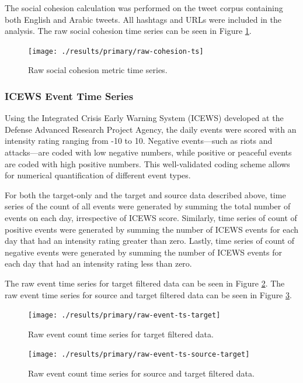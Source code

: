 \documentclass[
  english,
  man]{apa6}
\begin{document}
\noindent The social cohesion calculation was performed on the tweet corpus
containing both English and Arabic tweets. All hashtags and URLs were included
in the analysis. The raw social cohesion time series can be seen in Figure
\ref{fig:raw-cohesion-ts}.

\begin{figure}
\texttt{[image: ./results/primary/raw-cohesion-ts]} \caption{Raw social cohesion metric time series.}\label{fig:raw-cohesion-ts}
\end{figure}

\hypertarget{icews-event-time-series}{%
\subsubsection{ICEWS Event Time Series}\label{icews-event-time-series}}

Using the Integrated Crisis Early Warning System (ICEWS) developed at the
Defense Advanced Research Project Agency, the daily events were scored with an
intensity rating ranging from -10 to 10. Negative events---such as riots and
attacks---are coded with low negative numbers, while positive or peaceful events
are coded with high positive numbers. This well-validated coding scheme allows
for numerical quantification of different event types.

For both the target-only and the target and source data described above, time
series of the count of all events were generated by summing the total number of
events on each day, irrespective of ICEWS score. Similarly, time series of count
of positive events were generated by summing the number of ICEWS events for each
day that had an intensity rating greater than zero. Lastly, time series of count
of negative events were generated by summing the number of ICEWS events for each
day that had an intensity rating less than zero.

The raw event time series for target filtered data can be seen in Figure
\ref{fig:raw-event-ts-target}. The raw event time series for source and target
filtered data can be seen in Figure \ref{fig:raw-event-ts-source-target}.

\begin{figure}
\texttt{[image: ./results/primary/raw-event-ts-target]} \caption{Raw event count time series for target filtered data.}\label{fig:raw-event-ts-target}
\end{figure}

\begin{figure}
\texttt{[image: ./results/primary/raw-event-ts-source-target]} \caption{Raw event count time series for source and target filtered data.}\label{fig:raw-event-ts-source-target}
\end{figure}
\end{document}
